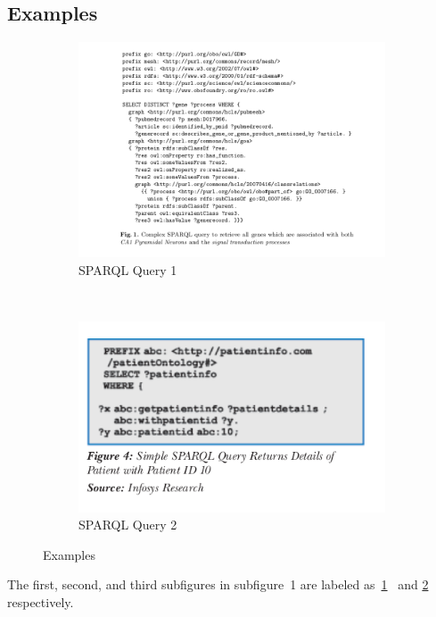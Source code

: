 \documentclass[DIV=calc, paper=a4, fontsize=12pt, onecolumn]{scrartcl}	 %
\begin{document}
  \subsection{Examples}
  \begin{figure}[h!]
    \begin{subfigure}[b]{.5\linewidth}
      \includegraphics[width=1.2\textwidth]{sparql1.png}
      \caption{SPARQL Query 1}
      \label{fig:first}
    \end{subfigure}
    ~
    \begin{subfigure}[b]{.5\linewidth}
      \includegraphics[width=1.2\textwidth]{sparqlh.png}
      \caption{SPARQL Query 2}
      \label{fig:second}
    \end{subfigure}
    \caption{Examples}
    \label{fig:sparql_examples}
  \end{figure}

  \noindent The first, second, and third subfigures in subfigure\
  1 are labeled as\
  \ref{fig:first} \cite{stenzhorn2008simplifying}\
  and \ref{fig:second}  \cite{parachuri2008role} respectively.\\
\end{document}
